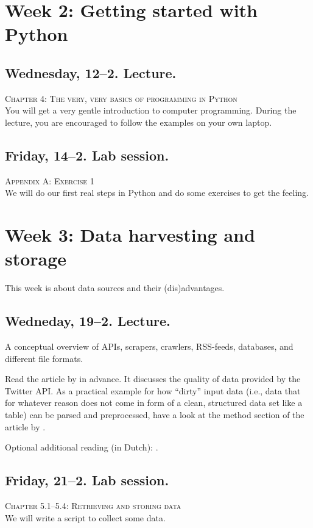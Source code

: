 \section*{Week 2: Getting started with Python}

\subsection*{Wednesday, 12--2. Lecture.}
\textsc{ Chapter 4: The very, very basics of programming in Python}\\
You will get a very gentle introduction to computer programming. During the lecture, you are encouraged to follow the examples on your own laptop.


\subsection*{Friday, 14--2. Lab session.}
\textsc{ Appendix A: Exercise 1}\\
We will do our first real steps in Python and do some exercises to get the feeling. 


\section*{Week 3: Data harvesting and storage}
This week is about data sources and their (dis)advantages. 

\subsection*{Wedneday, 19--2. Lecture.}
A conceptual overview of APIs, scrapers, crawlers, RSS-feeds, databases, and different file formats.

Read the article by \cite{Morstatter2013} in advance. It discusses the quality of data provided by the Twitter API. As a practical example for how ``dirty'' input data (i.e., data that for whatever reason does not come in form of a clean, structured data set like a table) can be parsed and preprocessed, have a look at the method section of the article by \cite{Lewis2013}. 

Optional additional reading (in Dutch): \cite{Welbers2018}.


\subsection*{Friday, 21--2. Lab session.}
\textsc{ Chapter 5.1--5.4: Retrieving and storing data}\\
We will write a script to collect some data. 




